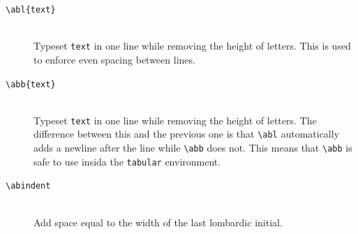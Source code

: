\documentclass[a4paper]{article}
\newcommand{\feature}[1]{\texttt{#1}}
\newcommand{\ltxncmd}[1]{\texttt{\textbackslash{}#1}}
\newcommand{\ltxcmd}[2]{\texttt{\textbackslash{}#1\{#2\}}}
\begin{document}
\begin{description}

\item [\ltxcmd{abl}{text}] \mbox{} \\
  Typeset \feature{text} in one line while removing the height of
  letters. This is used to enforce even spacing between lines. 

\item [\ltxcmd{abb}{text}] \mbox{} \\
  Typeset \feature{text} in one line while removing the height of
  letters. The difference between this and the previous one is that
  \ltxncmd{abl} automatically adds a newline after the line while
  \ltxncmd{abb} does not. This means that \ltxncmd{abb} is safe to use
  insida the \feature{tabular} environment. 


\item[\ltxncmd{abindent}] \mbox{} \\
  Add space equal to the width of the last lombardic initial.

\end{description}
\end{document}
